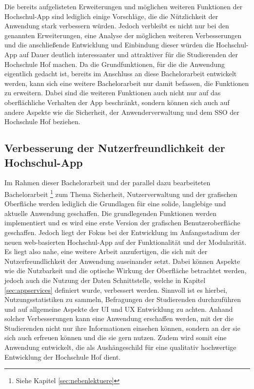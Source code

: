 Die bereits aufgelisteten Erweiterungen und möglichen weiteren Funktionen der Hoch\-schul-\ac{App} sind lediglich einige Vorschläge, die die Nützlichkeit der Anwendung stark verbessern würden. Jedoch verbleibt es nicht nur bei den genannten Erweiterungen, eine Analyse der möglichen weiteren Verbesserungen und die anschließende Entwicklung und Einbindung dieser würden die Hochschul-\ac{App} auf Dauer deutlich interessanter und attraktiver für die Studierenden der Hochschule Hof machen. Da die Grundfunktionen, für die die Anwendung eigentlich gedacht ist, bereits im Anschluss an diese Bachelorarbeit entwickelt werden, kann sich eine weitere Bachelorarbeit nur damit befassen, die Funktionen zu erweitern. Dabei sind die weiteren Funktionen auch nicht nur auf das oberflächliche Verhalten der \ac{App} beschränkt, sondern können sich auch auf andere Aspekte wie die Sicherheit, der Anwenderverwaltung und dem \ac{SSO} der Hochschule Hof beziehen. 

\subsection*{Verbesserung der Nutzerfreundlichkeit der Hochschul-\ac{App}}

Im Rahmen dieser Bachelorarbeit und der parallel dazu bearbeiteten Bachelorarbeit \footnote{Siehe Kapitel \ref{sec:nebenlektuere}} zum Thema Sicherheit, Nutzerverwaltung und der grafischen Oberfläche werden lediglich die Grundlagen für eine solide, langlebige und aktuelle Anwendung geschaffen. Die grundlegenden Funktionen werden implementiert und es wird eine erste Version der grafischen Benutzeroberfläche geschaffen. Jedoch liegt der Fokus bei der Entwicklung im Anfangsstadium der neuen web-basierten Hochschul-\ac{App} auf der Funktionalität und der Modularität. Es liegt also nahe, eine weitere Arbeit anzufertigen, die sich mit der Nutzerfreundlichkeit der Anwendung auseinander setzt. Dabei können Aspekte wie die Nutzbarkeit und die optische Wirkung der Oberfläche betrachtet werden, jedoch auch die Nutzung der Daten Schnittstelle, welche in Kapitel \ref{sec:appservices} definiert wurde, verbessert werden. Sinnvoll ist es hierbei, Nutzungsstatistiken zu sammeln, Befragungen der Studierenden durchzuführen und auf allgemeine Aspekte der \ac{UI} und \ac{UX} Entwicklung zu achten. Anhand solcher Verbesserungen kann eine Anwendung erschaffen werden, mit der die Studierenden nicht nur ihre Informationen einsehen können, sondern an der sie sich auch erfreuen können und die sie gern nutzen. Zudem wird somit eine Anwendung entwickelt, die als Aushängeschild für eine qualitativ hochwertige Entwicklung der Hochschule Hof dient.


